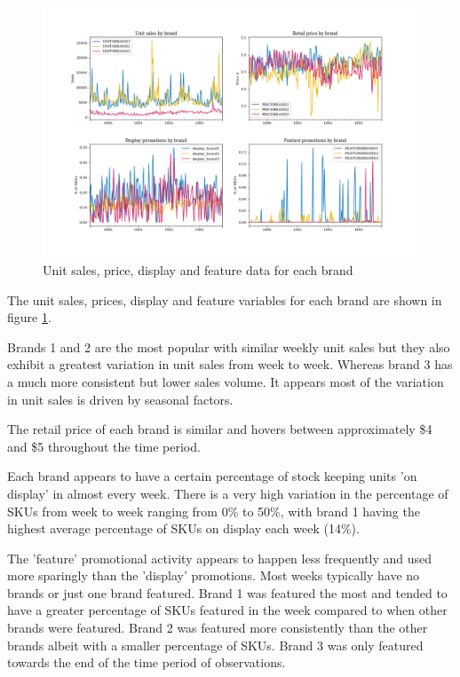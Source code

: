 \documentclass[a4paper,11pt]{article}
\begin{document}
\begin{figure}
  \centering
  \includegraphics[scale=0.38]{eda_plots}
  \caption{Unit sales, price, display and feature data for each brand}\label{fig:eda-plots}
\end{figure}

The unit sales, prices, display and feature variables for each brand are shown in figure \ref{fig:eda-plots}. 

Brands 1 and 2 are the most popular with similar weekly unit sales but they also exhibit a greatest variation in unit sales from week to week. Whereas brand 3 has a much more consistent but lower sales volume. It appears most of the variation in unit sales is driven by seasonal factors.

The retail price of each brand is similar and hovers between approximately \$4 and \$5 throughout the time period. 

Each brand appears to have a certain percentage of stock keeping units 'on display' in almost every week. There is a very high variation in the percentage of SKUs from week to week ranging from 0\% to 50\%, with brand 1 having the highest average percentage of SKUs on display each week (14\%).

The 'feature' promotional activity appears to happen less frequently and used more sparingly than the 'display' promotions. Most weeks typically have no brands or just one brand featured. Brand 1 was featured the most and tended to have a greater percentage of SKUs featured in the week compared to when other brands were featured. Brand 2 was featured more consistently than the other brands albeit with a smaller percentage of SKUs. Brand 3 was only featured towards the end of the time period of observations. 
\end{document}
